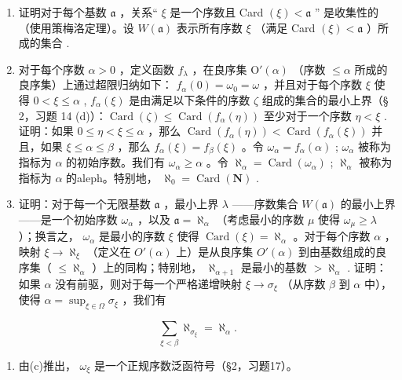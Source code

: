 \begin{enumerate}
\def\labelenumi{(\alph{enumi})}
\item
  证明对于每个基数 \(\mathfrak{a}\) ，关系“ \(\xi\) 是一个序数且 Card \((\xi) < \mathfrak{a}\) ” 是收集性的（使用策梅洛定理）。设 \(W(\mathfrak{a})\) 表示所有序数 \(\xi\) （满足 Card \((\xi) < \mathfrak{a}\) ）所成的集合 .
\item
  对于每个序数 \(\alpha > 0\) ，定义函数 \(f_{\lambda}\) ，在良序集 \(\mathrm{O}'(\alpha)\) （序数 \(\leqslant \alpha\) 所成的良序集）上通过超限归纳如下： \(f_{\alpha}(0) = \omega_0 = \omega\) ，并且对于每个序数 \(\xi\) 使得 \(0 < \xi \leqslant \alpha\) , \(f_{\alpha}(\xi)\) 是由满足以下条件的序数 \(\zeta\) 组成的集合的最小上界（§ 2，习题 14 (d)）：\(\operatorname{Card}(\zeta) \leqslant \operatorname{Card}(f_{\alpha}(\eta))\) 至少对于一个序数 \(\eta < \xi\) . 证明：如果 \(0 \leqslant \eta < \xi \leqslant \alpha\) ，那么 \(\operatorname{Card}(f_{\alpha}(\eta)) < \operatorname{Card}(f_{\alpha}(\xi))\) 并且，如果 \(\xi \leqslant \alpha \leqslant \beta\) ，那么 \(f_{\alpha}(\xi) = f_{\beta}(\xi)\) 。令 \(\omega_{\alpha} = f_{\alpha}(\alpha)\) ; \(\omega_{\alpha}\) 被称为指标为 \(\alpha\) 的初始序数。我们有 \(\omega_{\alpha} \geqslant \alpha\) 。令 \(\aleph_{\alpha} = \operatorname{Card}(\omega_{\alpha})\) ; \(\aleph_{\alpha}\) 被称为指标为 \(\alpha\) 的aleph。特别地， \(\aleph_0 = \operatorname{Card}(\mathbf{N})\) .
\item
  证明：对于每一个无限基数 \(\mathfrak{a}\) ，最小上界 \(\lambda\) ——序数集合 \(W(\mathfrak{a})\) 的最小上界——是一个初始序数 \(\omega_{\alpha}\) ，以及 \(\mathfrak{a} = \aleph_{\alpha}\) （考虑最小的序数 \(\mu\) 使得 \(\omega_{\mu} \geqslant \lambda\) ）；换言之， \(\omega_{\alpha}\) 是最小的序数 \(\xi\) 使得 \(\operatorname{Card}(\xi) = \aleph_{\alpha}\) 。对于每个序数 \(\alpha\) ，映射 \(\xi \to \aleph_{\xi}\) （定义在 \(O'(\alpha)\) 上）是从良序集 \(O'(\alpha)\) 到由基数组成的良序集（ \(\leqslant \aleph_{\alpha}\) ）上的同构；特别地， \(\aleph_{\alpha+1}\) 是最小的基数 \(> \aleph_{\alpha}\) . 证明：如果 \(\alpha\) 没有前驱，则对于每一个严格递增映射 \(\xi \to \sigma_{\xi}\) （从序数 \(\beta\) 到 \(\alpha\) 中），使得 \(\alpha = \sup_{\xi \in \Omega} \sigma_{\xi}\) ，我们有
\end{enumerate}

\[
\sum_ {\xi <   \beta} \aleph_ {\sigma_ {\xi}} = \aleph_ {\alpha}.
\]

\begin{enumerate}
\def\labelenumi{(\alph{enumi})}
\setcounter{enumi}{3}
\tightlist
\item
  由(c)推出， \(\omega_{\xi}\) 是一个正规序数泛函符号（§2，习题17）。
\end{enumerate}


